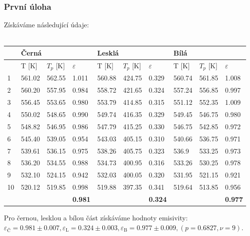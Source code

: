 \documentclass[czech,11pt,a4paper]{article}
\begin{document}
	\subsubsection{První úloha}
		Získáváme následující údaje:\\ \\
	\begin{center}
			\begin{tabular}{l|lll|lll|lll}  
			& \multicolumn{3}{l}{Černá}       & \multicolumn{3}{l}{Lesklá}       & \multicolumn{3}{l}{Bílá}        \\ \hline
			& T [K]     & $T_p$ [K]  & $\varepsilon$ & T [K]       & $T_p$ [K]& $\varepsilon$ & T [K]     & $T_p$ [K]  & $\varepsilon$ \\ \hline
			1  & 561.02 & 562.55 & 1.011         & 560.88  & 424.75 & 0.329         & 560.74 & 561.85 & 1.008         \\ \hline
			2  & 560.20  & 557.95 & 0.984         & 558.72  & 421.65 & 0.324         & 557.24 & 556.85 & 0.997         \\ \hline
			3  & 556.45 & 553.65 & 0.980         & 553.79 & 414.85 & 0.315         & 551.12 & 552.35 & 1.009         \\ \hline
			4  & 550.02 & 548.65 & 0.990         & 549.74 & 416.35 & 0.329         & 549.45 & 546.75 & 0.980         \\ \hline
			5  & 548.82 & 546.95 & 0.986         & 547.79 & 415.25 & 0.330         & 546.75 & 542.85 & 0.972         \\ \hline
			6  & 545.40  & 539.05 & 0.954         & 543.03  & 405.15 & 0.310         & 540.66 & 536.75 & 0.971         \\ \hline
			7  & 539.61 & 536.15 & 0.975         & 538.26 & 405.75 & 0.323         & 536.9  & 533.25 & 0.973         \\ \hline
			8  & 536.20  & 534.55 & 0.988         & 534.73  & 400.95 & 0.316         & 533.26 & 530.25 & 0.978         \\ \hline
			9  & 532.10  & 524.15 & 0.942         & 532.03 & 400.05 & 0.320         & 531.95 & 521.15 & 0.921         \\ \hline
			10 & 520.12 & 519.85 & 0.998         & 519.88  & 397.35 & 0.341         & 519.64 & 513.85 & 0.956         \\ \hline
			&        &        &\textbf{ 0.981 }        &         &        & \textbf{0.324}         &        &        & \textbf{0.977}        
		\end{tabular}
	\end{center}
	Pro černou, lesklou a bílou část získáváme hodnoty emisivity: \\ $\varepsilon_{\text{Č}} = 0.981 \pm 0.007, \varepsilon_{\text{L}} = 0.324 \pm 0.003, \varepsilon_{\text{B}} = 0.977 \pm 0.009, (p = 0.6827, \nu = 9).$
	
\end{document}
